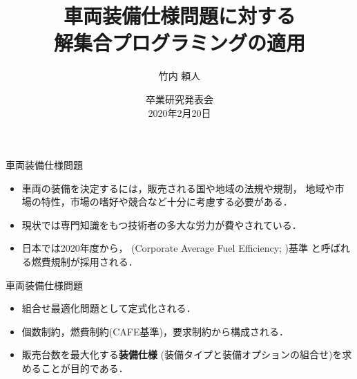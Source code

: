 \documentclass[dvipdfmx, 11pt,]{beamer}
\title{車両装備仕様問題に対する\\解集合プログラミングの適用}
\author{竹内 頼人}
\institute{番原研究室}
\date{卒業研究発表会\\2020年2月20日}
\begin{document}
\begin{frame} {}
 \titlepage
\end{frame}
\begin{frame}{車両装備仕様問題}
  \begin{itemize}
  \item 車両の装備を決定するには，販売される国や地域の法規や規制，
    地域や市場の特性，市場の嗜好や競合など十分に考慮する必要がある．
  \item 現状では専門知識をもつ技術者の多大な労力が費やされている．
  \item 日本では2020年度から，
    (Corporate Average Fuel Efficiency; )基準
    と呼ばれる燃費規制が採用される．
  \end{itemize}
  \vfill
  \begin{alertblock}{車両装備仕様問題}
    \begin{itemize}
    \item 組合せ最適化問題として定式化される．
    \item \alert{個数制約}，\alert{燃費制約}(CAFE基準)，\alert{要求制約}から構成される．
    \item \alert{販売台数を最大化}する\textbf{装備仕様}
      (装備タイプと装備オプションの組合せ)を求めることが目的である．
    \end{itemize}
  \end{alertblock}
\end{frame}
\end{document}
